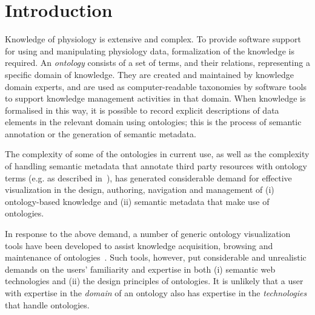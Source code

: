 \section{Introduction}                                                                   %

Knowledge of physiology is extensive and complex. To provide software support for using and manipulating physiology data, formalization of the knowledge is required. An \emph{ontology} consists of a set of terms, and their relations, representing a specific domain of knowledge. They are created and maintained by knowledge domain experts, and are used as computer-readable taxonomies by software tools to support knowledge management activities in that domain.
When knowledge is formalised in this way, it is possible to record explicit descriptions of data elements in the relevant domain using ontologies; this is the process of semantic annotation or the generation of semantic metadata.

The complexity of some of the ontologies in current use, as well as the complexity of handling semantic metadata that annotate third party resources with ontology terms (e.g. as described in~\cite{BHW+11}), has generated considerable demand for effective visualization in the design, authoring, navigation and management of (i) ontology-based knowledge and (ii) semantic metadata that make use of ontologies.

In response to the above demand, a number of generic ontology visualization tools have been developed to assist knowledge acquisition, browsing and maintenance of ontologies~\cite{KHL+07}. Such tools, however, put considerable and unrealistic demands on the users' familiarity and expertise in both (i) semantic web technologies and (ii) the design principles of ontologies. It is unlikely that a user with expertise in the \emph{domain} of an ontology also has expertise in the \emph{technologies} that handle ontologies.

